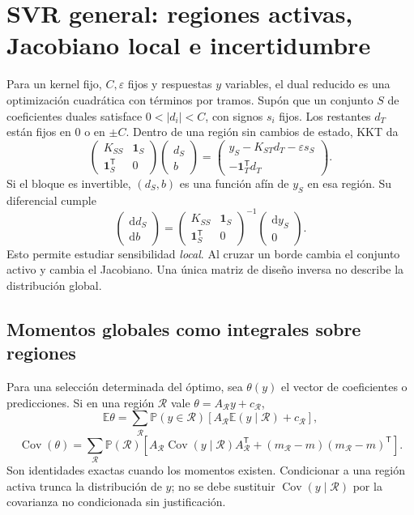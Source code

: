 \documentclass[11pt,a4paper]{article}
\newcommand{\E}{\mathbb E}
\newcommand{\Prob}{\mathbb P}
\newcommand{\T}{^{\mathsf T}}
\DeclareMathOperator{\Cov}{Cov}
\newcommand{\ones}{\mathbf 1}
\theoremstyle{definition}
\begin{document}
\section{SVR general: regiones activas, Jacobiano local e incertidumbre}
Para un kernel fijo, $C,\varepsilon$ fijos y respuestas $y$ variables, el dual reducido es una optimización cuadrática con términos por tramos. Supón que un conjunto $S$ de coeficientes duales satisface $0<|d_i|<C$, con signos $s_i$ fijos. Los restantes $d_T$ están fijos en $0$ o en $\pm C$. Dentro de una región sin cambios de estado, KKT da
\[
\begin{pmatrix}K_{SS}&\ones_S\\\ones_S\T&0\end{pmatrix}
\begin{pmatrix}d_S\\b\end{pmatrix}
=\begin{pmatrix}y_S-K_{ST}d_T-\varepsilon s_S\\-\ones_T\T d_T\end{pmatrix}.
\]
Si el bloque es invertible, $(d_S,b)$ es una función afín de $y_S$ en esa región. Su diferencial cumple
\[
\begin{pmatrix}\mathrm dd_S\\\mathrm db\end{pmatrix}
=\begin{pmatrix}K_{SS}&\ones_S\\\ones_S\T&0\end{pmatrix}^{-1}
\begin{pmatrix}\mathrm dy_S\\0\end{pmatrix}.
\]
Esto permite estudiar sensibilidad \emph{local}. Al cruzar un borde cambia el conjunto activo y cambia el Jacobiano. Una única matriz de diseño inversa no describe la distribución global.
\subsection{Momentos globales como integrales sobre regiones}
Para una selección determinada del óptimo, sea $\theta(y)$ el vector de coeficientes o predicciones. Si en una región $\mathcal R$ vale $\theta=A_{\mathcal R}y+c_{\mathcal R}$,
\[
\E\theta=\sum_{\mathcal R}\Prob(y\in\mathcal R)
\left[A_{\mathcal R}\E(y\mid\mathcal R)+c_{\mathcal R}\right],
\]
\[
\Cov(\theta)=\sum_{\mathcal R}\Prob(\mathcal R)
\left[A_{\mathcal R}\Cov(y\mid\mathcal R)A_{\mathcal R}\T
+(m_{\mathcal R}-m)(m_{\mathcal R}-m)\T\right].
\]
Son identidades exactas cuando los momentos existen. Condicionar a una región activa trunca la distribución de $y$; no se debe sustituir $\Cov(y\mid\mathcal R)$ por la covarianza no condicionada sin justificación.
\end{document}
